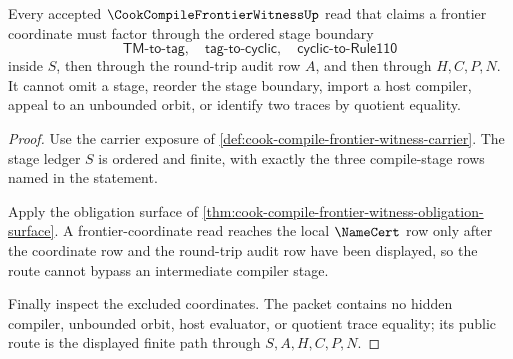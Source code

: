 \begin{theorem}
\label{thm:cook-compile-frontier-stage-boundary-nonescape}
Every accepted $\CookCompileFrontierWitnessUp$ read that claims a frontier coordinate must factor through the ordered stage boundary
$$
\mathsf{TM}\text{-}\mathsf{to}\text{-}\mathsf{tag},\quad
\mathsf{tag}\text{-}\mathsf{to}\text{-}\mathsf{cyclic},\quad
\mathsf{cyclic}\text{-}\mathsf{to}\text{-}\mathsf{Rule110}
$$
inside $S$, then through the round-trip audit row $A$, and then through $H,C,P,N$. It cannot omit a stage, reorder the stage boundary, import a host compiler, appeal to an unbounded orbit, or identify two traces by quotient equality.
\end{theorem}
\begin{proof}
Use the carrier exposure of \autoref{def:cook-compile-frontier-witness-carrier}. The stage ledger $S$ is ordered and finite, with exactly the three compile-stage rows named in the statement.

Apply the obligation surface of \autoref{thm:cook-compile-frontier-witness-obligation-surface}. A frontier-coordinate read reaches the local $\NameCert$ row only after the coordinate row and the round-trip audit row have been displayed, so the route cannot bypass an intermediate compiler stage.

Finally inspect the excluded coordinates. The packet contains no hidden compiler, unbounded orbit, host evaluator, or quotient trace equality; its public route is the displayed finite path through $S,A,H,C,P,N$.
\end{proof}

